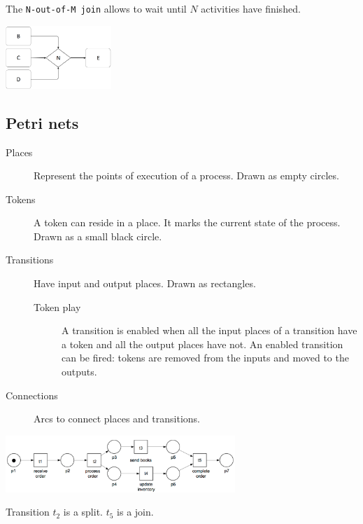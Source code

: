 \begin{description}
        \begin{example}
            The \texttt{N-out-of-M join} allows to wait until $N$ activities have finished.
            \begin{center}
                \includegraphics[width=0.3\textwidth]{img/bp_control_flow_n_out_of_m_join.png}
            \end{center}
        \end{example}
\end{description}



\subsection{Petri nets}

\begin{description}
    \item[Places] 
        Represent the points of execution of a process.
        Drawn as empty circles.

    \item[Tokens] 
        A token can reside in a place.
        It marks the current state of the process.
        Drawn as a small black circle.
    
    \item[Transitions] 
        Have input and output places.
        Drawn as rectangles.

        \begin{description}
            \item[Token play]
                A transition is enabled when all the input places of a transition have a token and all the output places have not.
                An enabled transition can be fired: tokens are removed from the inputs and moved to the outputs.
        \end{description}

    \item[Connections] 
        Arcs to connect places and transitions.
\end{description}

\begin{example} \phantom{}
    \begin{center}
        \includegraphics[width=0.65\textwidth]{img/petri_net_example1.png}
    \end{center}
    Transition $t_2$ is a split. $t_5$ is a join.
\end{example}

